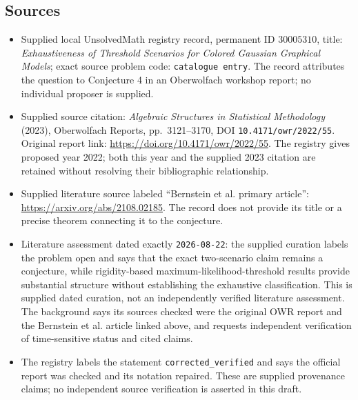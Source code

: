 \documentclass[11pt]{article}
\begin{document}
\subsection{Sources}
\begin{itemize}
\item Supplied local UnsolvedMath registry record, permanent ID \(30005310\), title: \emph{Exhaustiveness of Threshold Scenarios for Colored Gaussian Graphical Models}; exact source problem code: \texttt{catalogue entry}. The record attributes the question to Conjecture 4 in an Oberwolfach workshop report; no individual proposer is supplied.
\item Supplied source citation: \emph{Algebraic Structures in Statistical Methodology} (2023), Oberwolfach Reports, pp.\ 3121--3170, DOI \texttt{10.4171/owr/2022/55}. Original report link: \url{https://doi.org/10.4171/owr/2022/55}. The registry gives proposed year 2022; both this year and the supplied 2023 citation are retained without resolving their bibliographic relationship.
\item Supplied literature source labeled ``Bernstein et al. primary article'': \url{https://arxiv.org/abs/2108.02185}. The record does not provide its title or a precise theorem connecting it to the conjecture.
\item Literature assessment dated exactly \texttt{2026-08-22}: the supplied curation labels the problem open and says that the exact two-scenario claim remains a conjecture, while rigidity-based maximum-likelihood-threshold results provide substantial structure without establishing the exhaustive classification. This is supplied dated curation, not an independently verified literature assessment. The background says its sources checked were the original OWR report and the Bernstein et al. article linked above, and requests independent verification of time-sensitive status and cited claims.
\item The registry labels the statement \texttt{corrected\_verified} and says the official report was checked and its notation repaired. These are supplied provenance claims; no independent source verification is asserted in this draft.
\end{itemize}
\end{document}
